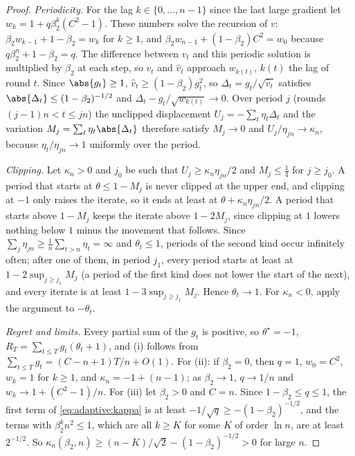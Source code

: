 \begin{refsection}
\begin{proof}
\emph{Periodicity.} For the lag $k\in\{0,\dots,n-1\}$ since the last large gradient let $w_k=1+q\beta_2^k(C^2-1)$. These numbers solve the recursion of $v$: $\beta_2w_{k-1}+1-\beta_2=w_k$ for $k\ge1$, and $\beta_2w_{n-1}+(1-\beta_2)C^2=w_0$ because $q\beta_2^n+1-\beta_2=q$. The difference between $v_t$ and this periodic solution is multiplied by $\beta_2$ at each step, so $v_t$ and $\hat v_t$ approach $w_{k(t)}$, $k(t)$ the lag of round $t$. Since $\abs{g_t}\ge1$, $\hat v_t\ge(1-\beta_2)g_t^2$, so $\Delta_t=g_t/\sqrt{\hat v_t}$ satisfies $\abs{\Delta_t}\le(1-\beta_2)^{-1/2}$ and $\Delta_t-g_t/\sqrt{w_{k(t)}}\to0$. Over period $j$ (rounds $(j-1)n<t\le jn$) the unclipped displacement $U_j=-\sum_t\eta_t\Delta_t$ and the variation $M_j=\sum_t\eta_t\abs{\Delta_t}$ therefore satisfy $M_j\to0$ and $U_j/\eta_{jn}\to\kappa_n$, because $\eta_t/\eta_{jn}\to1$ uniformly over the period.

\emph{Clipping.} Let $\kappa_n>0$ and $j_0$ be such that $U_j\ge\kappa_n\eta_{jn}/2$ and $M_j\le\frac14$ for $j\ge j_0$. A period that starts at $\theta\le1-M_j$ is never clipped at the upper end, and clipping at $-1$ only raises the iterate, so it ends at least at $\theta+\kappa_n\eta_{jn}/2$. A period that starts above $1-M_j$ keeps the iterate above $1-2M_j$, since clipping at $1$ lowers nothing below $1$ minus the movement that follows. Since $\sum_j\eta_{jn}\ge\frac1n\sum_{t>n}\eta_t=\infty$ and $\theta_t\le1$, periods of the second kind occur infinitely often; after one of them, in period $j_1$, every period starts at least at $1-2\sup_{j\ge j_1}M_j$ (a period of the first kind does not lower the start of the next), and every iterate is at least $1-3\sup_{j\ge j_1}M_j$. Hence $\theta_t\to1$. For $\kappa_n<0$, apply the argument to $-\theta_t$.

\emph{Regret and limits.} Every partial sum of the $g_t$ is positive, so $\theta^\star=-1$, $R_T=\sum_{t\le T}g_t(\theta_t+1)$, and (i) follows from $\sum_{t\le T}g_t=(C-n+1)T/n+O(1)$. For (ii): if $\beta_2=0$, then $q=1$, $w_0=C^2$, $w_k=1$ for $k\ge1$, and $\kappa_n=-1+(n-1)$; as $\beta_2\to1$, $q\to1/n$ and $w_k\to1+(C^2-1)/n$. For (iii) let $\beta_2>0$ and $C=n$. Since $1-\beta_2\le q\le1$, the first term of \eqref{eq:adaptive:kappa} is at least $-1/\sqrt q\ge-(1-\beta_2)^{-1/2}$, and the terms with $\beta_2^kn^2\le1$, which are all $k\ge K$ for some $K$ of order $\ln n$, are at least $2^{-1/2}$. So $\kappa_n(\beta_2,n)\ge(n-K)/\sqrt2-(1-\beta_2)^{-1/2}>0$ for large $n$.
\end{proof}


\end{refsection}
